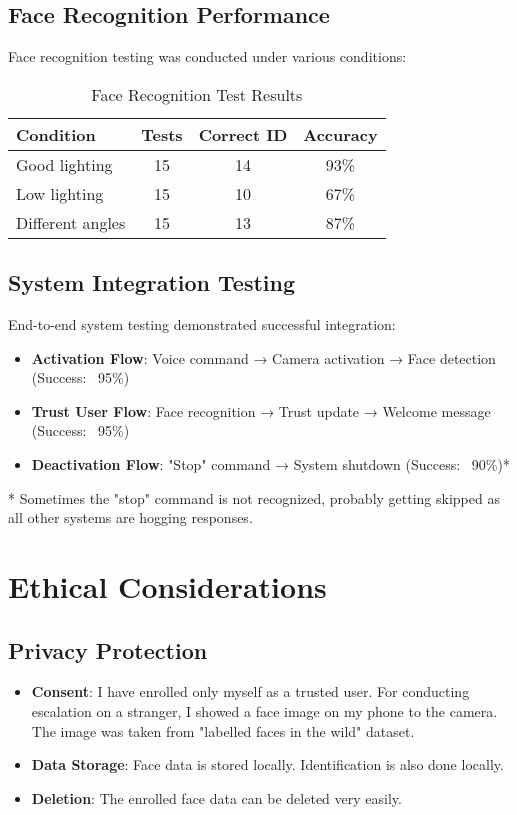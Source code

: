 \documentclass[11pt,a4paper]{article}
\begin{document}
\subsection{Face Recognition Performance}

Face recognition testing was conducted under various conditions:

\begin{table}[H]
\centering
\begin{tabular}{|l|c|c|c|}
\hline
\textbf{Condition} & \textbf{Tests} & \textbf{Correct ID} & \textbf{Accuracy} \\
\hline
Good lighting & 15 & 14 & 93\% \\
Low lighting & 15 & 10 & 67\% \\
Different angles & 15 & 13 & 87\% \\
\end{tabular}
\caption{Face Recognition Test Results}
\end{table}

\subsection{System Integration Testing}

End-to-end system testing demonstrated successful integration:

\begin{itemize}
    \item \textbf{Activation Flow}: Voice command → Camera activation → Face detection (Success: ~95\%)
    \item \textbf{Trust User Flow}: Face recognition → Trust update → Welcome message (Success: ~95\%)
    \item \textbf{Deactivation Flow}: "Stop" command → System shutdown (Success: ~90\%)* 
\end{itemize}
* Sometimes the "stop" command is not recognized, probably getting skipped as all other systems are hogging responses.
\section{Ethical Considerations}

\subsection{Privacy Protection}

\begin{itemize}
    \item \textbf{Consent}: I have enrolled only myself as a trusted user. For conducting escalation on a stranger, I showed a face image on my phone to the camera. The image was taken from "labelled faces in the wild" dataset.
    \item \textbf{Data Storage}: Face data is stored locally. Identification is also done locally.
    \item \textbf{Deletion}: The enrolled face data can be deleted very easily.
\end{itemize}
\end{document}
